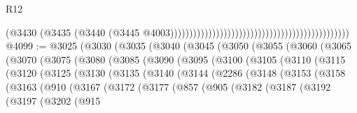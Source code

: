 \begin{lexlean}{R12}
\begin{coremodule}
                                                                                          (@3430
                                                                                            (@3435
                                                                                              (@3440
                                                                                                (@3445
                                                                                                  @4003)))))))))))))))))))))))))))))))))))))))))))))))
@4099 := @3025
    (@3030
      (@3035
        (@3040
          (@3045
            (@3050
              (@3055
                (@3060
                  (@3065
                    (@3070
                      (@3075
                        (@3080
                          (@3085
                            (@3090
                              (@3095
                                (@3100
                                  (@3105
                                    (@3110
                                      (@3115
                                        (@3120
                                          (@3125
                                            (@3130
                                              (@3135
                                                (@3140
                                                  (@3144
                                                    (@2286
                                                      (@3148
                                                        (@3153
                                                          (@3158
                                                            (@3163
                                                              (@910
                                                                (@3167
                                                                  (@3172
                                                                    (@3177
                                                                      (@857
                                                                        (@905
                                                                          (@3182
                                                                            (@3187
                                                                              (@3192
                                                                                (@3197
                                                                                  (@3202
                                                                                    (@915

\end{coremodule}
\end{lexlean}
